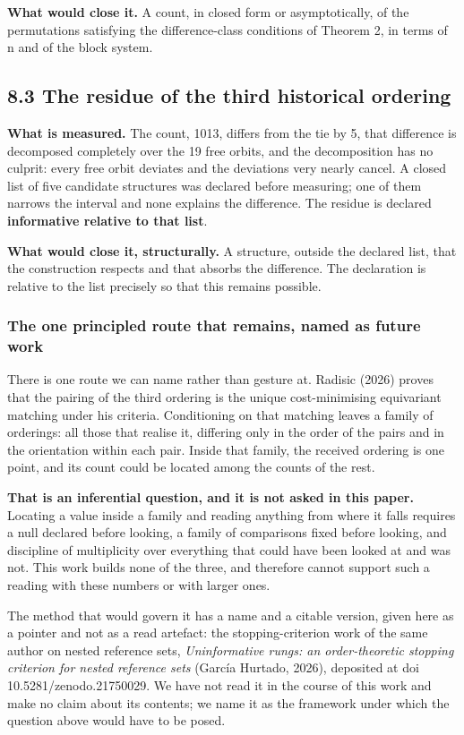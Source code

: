 \documentclass[11pt,a4paper]{article}
\begin{document}
\textbf{What would close it.} A count, in closed form or asymptotically, of the permutations satisfying the difference-class conditions of Theorem 2, in terms of n and of the block system.

\subsection*{8.3 The residue of the third historical ordering}

\textbf{What is measured.} The count, 1013, differs from the tie by 5, that difference is decomposed completely over the 19 free orbits, and the decomposition has no culprit: every free orbit deviates and the deviations very nearly cancel. A closed list of five candidate structures was declared before measuring; one of them narrows the interval and none explains the difference. The residue is declared \textbf{informative relative to that list}.

\textbf{What would close it, structurally.} A structure, outside the declared list, that the construction respects and that absorbs the difference. The declaration is relative to the list precisely so that this remains possible.

\subsubsection*{The one principled route that remains, named as future work}

There is one route we can name rather than gesture at. Radisic (2026) proves that the pairing of the third ordering is the unique cost-minimising equivariant matching under his criteria. Conditioning on that matching leaves a family of orderings: all those that realise it, differing only in the order of the pairs and in the orientation within each pair. Inside that family, the received ordering is one point, and its count could be located among the counts of the rest.

\textbf{That is an inferential question, and it is not asked in this paper.} Locating a value inside a family and reading anything from where it falls requires a null declared before looking, a family of comparisons fixed before looking, and discipline of multiplicity over everything that could have been looked at and was not. This work builds none of the three, and therefore cannot support such a reading with these numbers or with larger ones.

The method that would govern it has a name and a citable version, given here as a pointer and not as a read artefact: the stopping-criterion work of the same author on nested reference sets, \emph{Uninformative rungs: an order-theoretic stopping criterion for nested reference sets} (García Hurtado, 2026), deposited at doi 10.5281/zenodo.21750029. We have not read it in the course of this work and make no claim about its contents; we name it as the framework under which the question above would have to be posed.
\end{document}
